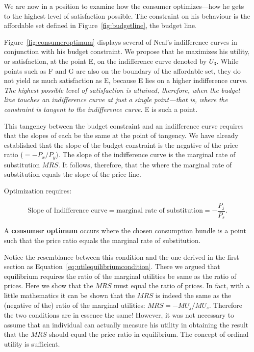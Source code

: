 We are now in a position to examine how the consumer optimizes---how he gets
to the highest level of satisfaction possible. The constraint on his
behaviour is the affordable set defined in Figure~\ref{fig:budgetline}, the
budget line.

Figure~\ref{fig:consumeroptimum} displays several of Neal's indifference
curves in conjunction with his budget constraint. We propose that he
maximizes his utility, or satisfaction, at the point E, on the indifference
curve denoted by $U_3$. While points such as F and G are also on the
boundary of the affordable set, they do not yield as much satisfaction as E,
because E lies on a higher indifference curve. \textit{The highest possible
	level of satisfaction is attained, therefore, when the budget line touches
	an indifference curve at just a single point---that is, where the constraint
	is tangent to the indifference curve}. E is such a point.



\newhtmlpage

This tangency between the budget constraint and an indifference curve
requires that the slopes of each be the same at the point of tangency. We
have already established that the slope of the budget constraint is the
negative of the price ratio ($=-P_{x}/P_{y}$). The slope of the indifference
curve is the marginal rate of substitution $MRS$. It follows, therefore,
that the  where the marginal rate of
substitution equals the slope of the price line.

Optimization requires:

\begin{equation}\label{eq:MRS}
	\text{Slope of Indifference curve}=\text{marginal rate of substitution}=-\frac{P_{j}}{P_{s}}.
\end{equation}

\begin{DefBox}
	A \textbf{consumer optimum} occurs where the chosen consumption bundle is a point such that the price ratio equals the marginal rate of substitution.
\end{DefBox}

Notice the resemblance between this condition and the one derived in the
first section as Equation~\ref{eq:utilequilibriumcondition}. There we argued
that equilibrium requires the ratio of the marginal utilities be same as the
ratio of prices. Here we show that the $MRS$ must equal the ratio of prices.
In fact, with a little mathematics it can be shown that the $MRS$ is indeed
the same as the (negative of the) ratio of the marginal utilities: 
$MRS=-MU_{j}/MU_{s}$. Therefore the two conditions are in essence the same!
However, it was not necessary to assume that an individual can actually
measure his utility in obtaining the result that the $MRS$ should equal the
price ratio in equilibrium. The concept of ordinal utility is sufficient.

